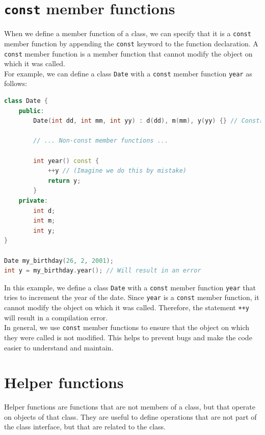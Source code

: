 \section{\texttt{const} member functions}

When we define a member function of a class, we can specify that it is a \texttt{const}
member function by appending the \texttt{const} keyword to the function declaration.
A \texttt{const} member function is a member function that cannot modify the object
on which it was called.\\

For example, we can define a class \texttt{Date} with a \texttt{const} member function
\texttt{year} as follows:\\

\begin{lstlisting}[language=C++]
class Date {
    public:
        Date(int dd, int mm, int yy) : d(dd), m(mm), y(yy) {} // Constructor

        // ... Non-const member functions ...

        int year() const {
            ++y // (Imagine we do this by mistake)
            return y; 
        }
    private:
        int d;
        int m;
        int y;
}

Date my_birthday(26, 2, 2001);
int y = my_birthday.year(); // Will result in an error
\end{lstlisting}

In this example, we define a class \texttt{Date} with a \texttt{const} member function
\texttt{year} that tries to increment the year of the date. Since \texttt{year} is a
\texttt{const} member function, it cannot modify the object on which it was called.
Therefore, the statement \texttt{++y} will result in a compilation error.\\

In general, we use \texttt{const} member functions to ensure that the object on which
they were called is not modified. This helps to prevent bugs and make the code easier
to understand and maintain.\\

\section{Helper functions}

Helper functions are functions that are not members of a class, but that operate on
objects of that class. They are useful to define operations that are not part of the
class interface, but that are related to the class.\\

